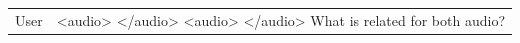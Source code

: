 \documentclass[preprint]{article}
\begin{document}
\begin{table}[hbt!]
\begin{tabular}{p{6.5cm} p{6.5cm}}
    User                                                                                                                                                                                                                                                                                                                                                                                                                                                                                                                                                                                                                                                                                 & <audio> </audio> <audio> </audio> What is related for both audio?                                                                                                                                                                                                                                                                                                                                                                                                                                                                                                                                                                                                                                                                                                                                                                                                                                                                                                                                                      \\

\end{tabular}
\end{table}
\end{document}
